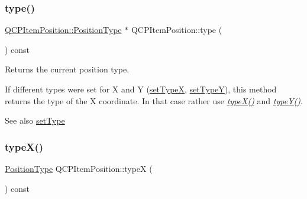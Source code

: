 \subsubsection{\texorpdfstring{type()}{type()}}
{\footnotesize\ttfamily \mbox{\hyperlink{class_q_c_p_item_position_aad9936c22bf43e3d358552f6e86dbdc8}{Q\+C\+P\+Item\+Position\+::\+Position\+Type}} $\ast$ Q\+C\+P\+Item\+Position\+::type (\begin{DoxyParamCaption}{ }\end{DoxyParamCaption}) const\hspace{0.3cm}{\ttfamily [inline]}}

Returns the current position type.

If different types were set for X and Y (\mbox{\hyperlink{class_q_c_p_item_position_a2113b2351d6d00457fb3559a4e20c3ea}{set\+TypeX}}, \mbox{\hyperlink{class_q_c_p_item_position_ac2a454aa5a54c1615c50686601ec4510}{set\+TypeY}}), this method returns the type of the X coordinate. In that case rather use {\itshape \mbox{\hyperlink{class_q_c_p_item_position_a1415911868835701c04250566bfc681d}{type\+X()}}} and {\itshape \mbox{\hyperlink{class_q_c_p_item_position_ae47bac6f679c58f9e1c78dc63d56f331}{type\+Y()}}}.

\begin{DoxySeeAlso}{See also}
\mbox{\hyperlink{class_q_c_p_item_position_aa476abf71ed8fa4c537457ebb1a754ad}{set\+Type}} 
\end{DoxySeeAlso}
\mbox{\label{class_q_c_p_item_position_a1415911868835701c04250566bfc681d}} 
\subsubsection{\texorpdfstring{typeX()}{typeX()}}
{\footnotesize\ttfamily \mbox{\hyperlink{class_q_c_p_item_position_aad9936c22bf43e3d358552f6e86dbdc8}{Position\+Type}} Q\+C\+P\+Item\+Position\+::typeX (\begin{DoxyParamCaption}{ }\end{DoxyParamCaption}) const\hspace{0.3cm}{\ttfamily [inline]}}

\mbox{\label{class_q_c_p_item_position_ae47bac6f679c58f9e1c78dc63d56f331}} 
